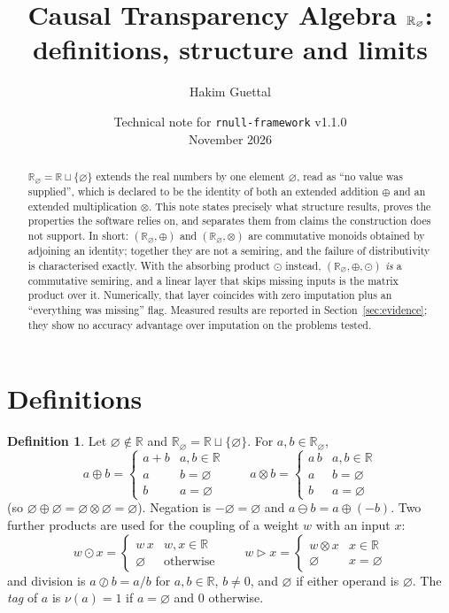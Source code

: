\documentclass[11pt,a4paper]{article}
\title{Causal Transparency Algebra $\Rn$:\\ definitions, structure and limits}
\author{Hakim Guettal}
\date{Technical note for \texttt{rnull-framework} v1.1.0 \\ November 2026}
\theoremstyle{definition}
\newtheorem{definition}[proposition]{Definition}
\theoremstyle{remark}
\newcommand{\R}{\mathbb{R}}
\newcommand{\Rn}{\R_{\varnothing}}
\newcommand{\nul}{\varnothing}
\newcommand{\op}{\oplus}
\newcommand{\ot}{\otimes}
\newcommand{\od}{\odot}
\newcommand{\sk}{\rhd}
\begin{document}
\maketitle

\begin{abstract}
\noindent
$\Rn=\R\sqcup\{\nul\}$ extends the real numbers by one element $\nul$, read as
``no value was supplied'', which is declared to be the identity of both an
extended addition $\op$ and an extended multiplication $\ot$. This note states
precisely what structure results, proves the properties the software relies
on, and separates them from claims the construction does not support. In
short: $(\Rn,\op)$ and $(\Rn,\ot)$ are commutative monoids obtained by adjoining
an identity; together they are not a semiring, and the failure of
distributivity is characterised exactly. With the absorbing product $\od$
instead, $(\Rn,\op,\od)$ \emph{is} a commutative semiring, and a linear layer
that skips missing inputs is the matrix product over it. Numerically, that
layer coincides with zero imputation plus an ``everything was missing'' flag.
Measured results are reported in Section~\ref{sec:evidence}; they show no
accuracy advantage over imputation on the problems tested.
\end{abstract}

\section{Definitions}

\begin{definition}
Let $\nul\notin\R$ and $\Rn=\R\sqcup\{\nul\}$. For $a,b\in\Rn$,
\[
a\op b=\begin{cases} a+b & a,b\in\R\\ a & b=\nul\\ b & a=\nul \end{cases}
\qquad
a\ot b=\begin{cases} a\,b & a,b\in\R\\ a & b=\nul\\ b & a=\nul \end{cases}
\]
(so $\nul\op\nul=\nul\ot\nul=\nul$). Negation is $-\nul=\nul$ and
$a\ominus b=a\op(-b)$. Two further products are used for the coupling of a
weight $w$ with an input $x$:
\[
w\od x=\begin{cases} w\,x & w,x\in\R\\ \nul & \text{otherwise} \end{cases}
\qquad
w\sk x=\begin{cases} w\ot x & x\in\R\\ \nul & x=\nul \end{cases}
\]
and division is $a\oslash b=a/b$ for $a,b\in\R$, $b\neq 0$, and $\nul$ if
either operand is $\nul$. The \emph{tag} of $a$ is $\nu(a)=1$ if $a=\nul$ and
$0$ otherwise.
\end{definition}
\end{document}
